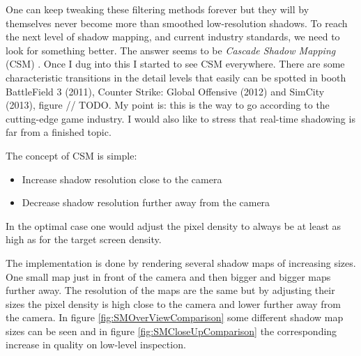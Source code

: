 One can keep tweaking these filtering methods forever but they will by themselves never become more than smoothed low-resolution shadows. To reach the next level of shadow mapping, and current industry standards, we need to look for something better. The answer seems to be \textit{Cascade Shadow Mapping} (CSM) \cite{CascadeShadowMapping}. Once I dug into this I started to see CSM everywhere. There are some characteristic transitions in the detail levels that easily can be spotted in booth BattleField 3 (2011), Counter Strike: Global Offensive (2012) and SimCity (2013), figure // TODO. My point is: this is the way to go according to the cutting-edge game industry. I would also like to stress that real-time shadowing is far from a finished topic. 

The concept of CSM is simple:

\begin{itemize}
\item Increase shadow resolution close to the camera
\item Decrease shadow resolution further away from the camera
\end{itemize}

In the optimal case one would adjust the pixel density to always be at least as high as for the target screen density. 

The implementation is done by rendering several shadow maps of increasing sizes. One small map just in front of the camera and then bigger and bigger maps further away. The resolution of the maps are the same but by adjusting their sizes the pixel density is high close to the camera and lower further away from the camera. In figure \ref{fig:SMOverViewComparison} some different shadow map sizes can be seen and in figure \ref{fig:SMCloseUpComparison} the corresponding increase in quality on low-level inspection. 

